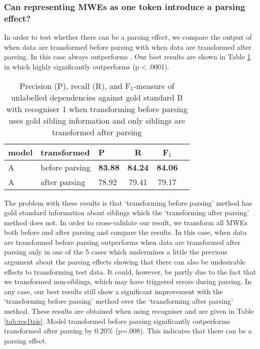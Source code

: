 \documentclass[output=paper]{LSP/langsci}
\begin{document}
\subsubsection{Can representing MWEs as one token introduce a parsing effect?}
\indent In order to test whether there can be a parsing effect, we compare the output of \modelA when data are transformed before parsing with \modelA when data are transformed after parsing. In this case \modelB always outperforms \modelA. Our best results are shown in Table \ref{tab:res1bisbis} in which \modelB highly significantly outperforms \modelA (p$<$.0001).

\begin{table}[H]
    \footnotesize
    \def\arraystretch{1.20} 
    \centering
    \begin{tabular}{| l | l | l | c | c | c |} \hline
        \textbf{model}
        & \textbf{transformed}
        & \textbf{P}
        & \textbf{R}
        & \textbf{F$_1$}
        \\ \hline
        A & before parsing &\textbf{83.88}  &\textbf{84.24}  & \textbf{84.06} \\
        A & after parsing &78.92  &79.41  & 79.17  \\
        \hline
    \end{tabular}
    \caption{Precision (P), recall (R), and F$_1$-measure of unlabelled dependencies against gold standard B with recogniser 1 when transforming before parsing uses gold sibling information and only siblings are transformed after parsing\label{tab:res1bisbis}}
\end{table}

\indent The problem with these results is that `transforming before parsing' method has gold standard information about siblings which the `transforming after parsing' method does not. In order to cross-validate our result, we transform all MWEs both before and after parsing and compare the results. In this case, \modelA when data are transformed before parsing outperforms \modelA when data are transformed after parsing only in one of the 5 cases which undermines a little the previous argument about the parsing effects showing that there can also be undesirable effects to transforming test data. It could, however, be partly due to the fact that we transformed non-siblings, which may have triggered errors during parsing. In any case, our best results still show a significant improvement with the `transforming before parsing' method over the `transforming after parsing' method. These results are obtained when using recogniser and are given in Table \ref{tab:res1tris}. Model transformed before parsing significantly outperforms \modelA transformed after parsing by 0.20\% (p=.008). This indicates that there can be a parsing effect.
\end{document}
